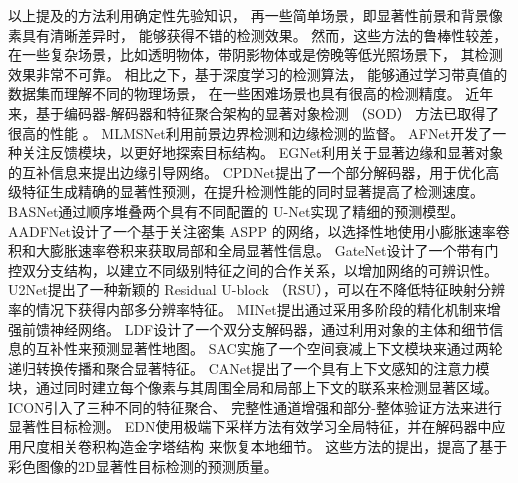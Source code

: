 



以上提及的方法利用确定性先验知识，
再一些简单场景，即显著性前景和背景像素具有清晰差异时，
能够获得不错的检测效果。
然而，这些方法的鲁棒性较差，
在一些复杂场景，比如透明物体，带阴影物体或是傍晚等低光照场景下，
其检测效果非常不可靠。
相比之下，基于深度学习的检测算法，
能够通过学习带真值的数据集而理解不同的物理场景，
在一些困难场景也具有很高的检测精度。
近年来，基于编码器-解码器和特征聚合架构的显著对象检测
（SOD）
方法已取得了很高的性能
。
MLMSNet利用前景边界检测和边缘检测的监督。
AFNet开发了一种关注反馈模块，以更好地探索目标结构。
EGNet利用关于显著边缘和显著对象的互补信息来提出边缘引导网络。
CPDNet提出了一个部分解码器，用于优化高级特征生成精确的显著性预测，在提升检测性能的同时显著提高了检测速度。
BASNet通过顺序堆叠两个具有不同配置的
U-Net实现了精细的预测模型。
AADFNet设计了一个基于关注密集 ASPP 的网络，以选择性地使用小膨胀速率卷积和大膨胀速率卷积来获取局部和全局显著性信息。
GateNet设计了一个带有门控双分支结构，以建立不同级别特征之间的合作关系，以增加网络的可辨识性。
U2Net提出了一种新颖的 Residual U-block （RSU），可以在不降低特征映射分辨率的情况下获得内部多分辨率特征。
MINet提出通过采用多阶段的精化机制来增强前馈神经网络。
LDF设计了一个双分支解码器，通过利用对象的主体和细节信息的互补性来预测显著性地图。
SAC实施了一个空间衰减上下文模块来通过两轮递归转换传播和聚合显著特征。
CANet提出了一个具有上下文感知的注意力模块，通过同时建立每个像素与其周围全局和局部上下文的联系来检测显著区域。
ICON引入了三种不同的特征聚合、
完整性通道增强和部分-整体验证方法来进行显著性目标检测。
EDN使用极端下采样方法有效学习全局特征，并在解码器中应用尺度相关卷积构造金字塔结构 
来恢复本地细节。
这些方法的提出，提高了基于彩色图像的2D显著性目标检测的预测质量。







